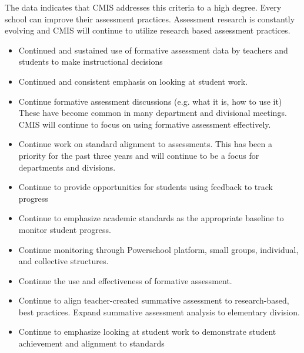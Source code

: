 \begin{findings}
The data indicates that CMIS addresses this criteria to a high degree. Every school can improve their assessment practices. Assessment research is constantly evolving and CMIS will continue to utilize research based assessment practices. 

\begin{itemize}
\item Continued and sustained use of formative assessment data by teachers and students to make instructional decisions
\item Continued and consistent emphasis on looking at student work. 
\item Continue formative assessment discussions (e.g. what it is, how to use it) These have become common in many department and divisional meetings. CMIS will continue to focus on using formative assessment effectively. 
\item Continue work on standard alignment to assessments. This has been a priority for the past three years and will continue to be a focus for departments and divisions. 
\item Continue to provide opportunities for students using feedback to track progress 
\item Continue to emphasize academic standards as the appropriate baseline to monitor student progress.
\item Continue monitoring through Powerschool platform, small groups, individual, and collective structures. 
\end{itemize}

\begin{itemize}
\item Continue the use and effectiveness of formative assessment. 
\item Continue to align teacher-created summative assessment to research-based, best practices. Expand summative assessment analysis to elementary division. 
\item Continue to emphasize looking at student work to demonstrate student achievement and alignment to standards 
\end{itemize}
\end{findings}
